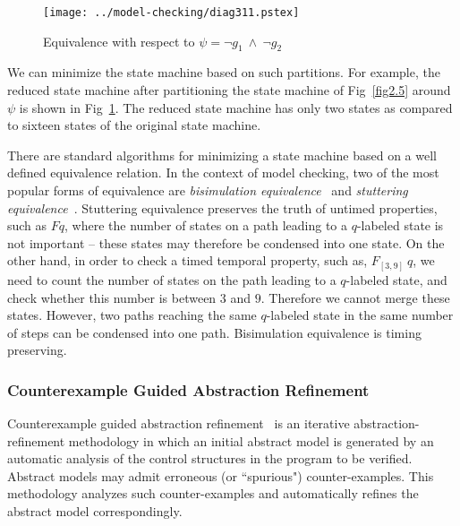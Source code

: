 \begin{figure}[htb]
\centering 
\texttt{[image: ../model-checking/diag311.pstex]}
\center
\caption{Equivalence with respect to $\psi = \neg g_1\ \land\ \neg g_2$}
\label{fig2.10}
\end{figure}

	\noindent
    We can minimize the state machine based on such partitions. For
    example, the reduced state machine after partitioning the state
    machine of Fig~\ref{fig2.5} around $\psi$ is shown in
    Fig~\ref{fig2.10}. The reduced state machine has only two states as
    compared to sixteen states of the original state machine.

	\noindent
    There are standard algorithms for minimizing a state machine based on
    a well defined equivalence relation. In the context of model checking,
    two of the most popular forms of equivalence are {\em bisimulation
    equivalence}~\cite{fisler:02} and {\em stuttering 
	equivalence}~\cite{clarke:00}. Stuttering equivalence 
    preserves the truth of untimed properties, such as $Fq$, where the 
    number of states on a path leading to a $q$-labeled state is not
    important -- these states may therefore be condensed into one state.
    On the other hand, in order to check a timed temporal property, such
    as, $F_{[3,9]}\ q$, we need to count the number of states on the path
    leading to a $q$-labeled state, and check whether this number is
    between $3$ and $9$. Therefore we cannot merge these states. However,
    two paths reaching the same $q$-labeled state in the same number of
    steps can be condensed into one path. Bisimulation equivalence is
    timing preserving.

\subsubsection{Counterexample Guided Abstraction Refinement}
Counterexample guided abstraction refinement~\cite{clarke:00b} 
is an iterative abstraction-refinement methodology in which an initial 
abstract model is generated by an automatic analysis of the control 
structures in the program to be verified. Abstract models may admit 
erroneous (or ``spurious") counter-examples. This methodology analyzes 
such counter-examples and automatically refines the abstract model 
correspondingly.

